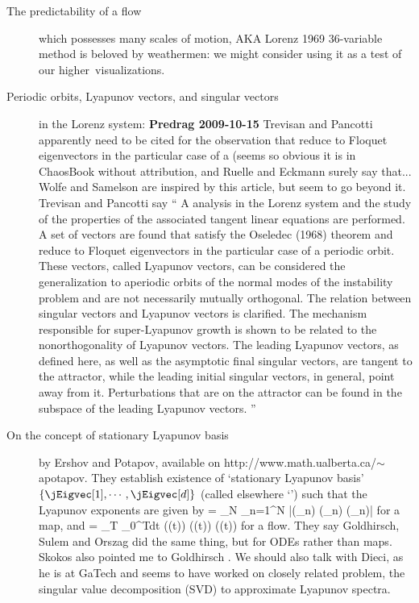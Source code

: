 \begin{description}
\item[The predictability of a flow] which possesses
                many scales of motion,
AKA Lorenz 1969 36-variable method is beloved by weathermen:
we might consider using it as a test of our higher\dmn\
visualizations.

\item[Periodic orbits, Lyapunov vectors, and singular
    vectors] in the Lorenz system:
{\bf Predrag 2009-10-15} Trevisan and Pancotti apparently
need to be cited for the observation that {\cLvs}
reduce to Floquet eigenvectors in the particular case of a
{\po} (seems so obvious it is in ChaosBook without
attribution, and Ruelle and Eckmann surely say
that... Wolfe and Samelson are inspired by this
article, but seem to go beyond it. Trevisan and Pancotti say
``
A {\po} analysis in the Lorenz system
and the study of the properties of the associated tangent
linear equations are performed.
			                                \inCB
A set of vectors are found
that satisfy the Oseledec (1968) theorem and reduce to
Floquet eigenvectors in the particular case of a periodic
orbit. These vectors, called Lyapunov vectors, can be
considered the generalization to aperiodic orbits of the
normal modes of the instability problem and are not
necessarily mutually orthogonal. The relation between
singular vectors and Lyapunov vectors is clarified. The
mechanism responsible for super-Lyapunov growth is shown to
be related to the nonorthogonality of Lyapunov vectors. The
leading Lyapunov vectors, as defined here, as well as the
asymptotic final singular vectors, are tangent to the
attractor, while the leading initial singular vectors, in
general, point away from it. Perturbations that are on the
attractor can be found in the subspace of the leading
Lyapunov vectors.
    ''

\item[On the concept of stationary {L}yapunov basis] by Ershov
and Potapov, available on
{http://www.math.ualberta.ca/$\sim$apotapov}. They establish
existence of `stationary {L}yapunov basis'					\inCB
$\{\jEigvec[1],\cdots,\jEigvec[d]\}$ (called elsewhere `{\cLvs}') such that the Lyapunov
exponents are given by										
\beq
    \eigExp[j] = \lim_{N \to \infty} 
         \sum_{n=1}^{N} \ln
    |\jEigvecT[j](\ssp_n) \jMps(\ssp_n) \jEigvec[j](\ssp_n)|
for a map, and
\beq
    \eigExp[j] = \lim_{T \to \infty} 
         \int_0^{T}dt
    \jEigvecT[j](\ssp(t)) \Mvar(\ssp(t)) \jEigvec[j](\ssp(t))
for a flow.
They say Goldhirsch, Sulem and Orszag
did the same thing, but for ODEs rather than maps.
Skokos also pointed me to Goldhirsch \etal. We should also
talk with Dieci,
as he is at GaTech and seems to have
worked on closely related problem, the singular value decomposition
(SVD) to approximate Lyapunov spectra.


\end{description}
